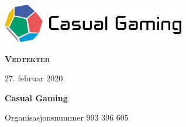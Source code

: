 \begin{titlepage}
    \centering
    \vspace*{1cm}
    \includegraphics[width=8cm]{innhold/logo-farger-tekst.png}\par
    \vspace*{4cm}
    {\rmfamily\Huge\bfseries\scshape Vedtekter}\par
    \vspace*{1cm}
    {27. februar 2020}\par
    \vfill
    {\bfseries Casual Gaming}\par
    \vspace*{0.5cm}
    {Organisasjonsnummer 993 396 605}\par
\end{titlepage}
